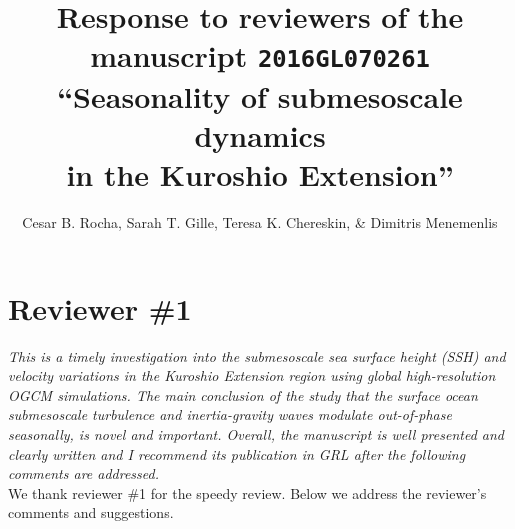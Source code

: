 \documentclass[11pt]{article}
\title{{\normalfont Response to reviewers of the manuscript \texttt{2016GL070261} }
       ``Seasonality of submesoscale
       dynamics \\in the Kuroshio Extension''}
\author{Cesar B. Rocha,
        Sarah T. Gille, Teresa K. Chereskin, \& Dimitris Menemenlis}
\date{}
\begin{document}
%

\maketitle


\section{Reviewer \#1}

{\it This is a timely investigation into the submesoscale sea surface height (SSH) and
velocity variations in the Kuroshio Extension region using global high-resolution
OGCM simulations. The main conclusion of the study that the surface ocean submesoscale
turbulence and inertia-gravity waves modulate out-of-phase seasonally, is novel and
important. Overall, the manuscript is well presented and clearly written and I
recommend its publication in GRL after the following comments are addressed.}\\

We thank reviewer \#1 for the speedy review. Below we address the reviewer’s
comments and suggestions.
\end{document}
